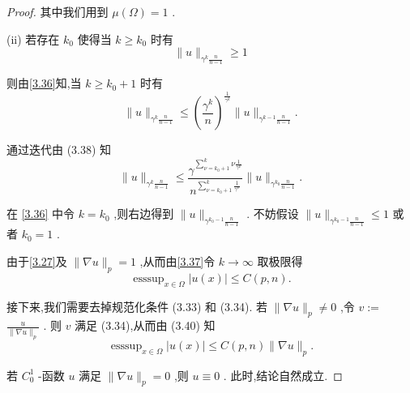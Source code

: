 \documentclass[lang=cn,newtx,10pt,scheme=chinese,thmcnt=chapter]{elegantbook}
\begin{document}
\begin{proof}
其中我们用到 \(\mu \left( \Omega \right)  = 1\) .

(ii) 若存在 \({k}_{0}\) 使得当 \(k \geq  {k}_{0}\) 时有
\begin{equation*}
\parallel u{\parallel }_{{\gamma }^{k}\frac{n}{n - 1}} \geq  1
\end{equation*}

则由\ref{3.36}知,当 \(k \geq  {k}_{0} + 1\) 时有
\begin{equation}
\parallel u{\parallel }_{{\gamma }^{k}\frac{n}{n - 1}} \leqslant  {\left( \frac{{\gamma }^{k}}{n}\right) }^{\frac{1}{{\gamma }^{k}}}\parallel u{\parallel }_{{\gamma }^{k - 1}\frac{n}{n - 1}}. \label{3.38}
\end{equation}

通过迭代由 (3.38) 知
\begin{equation}
\parallel u{\parallel }_{{\gamma }^{k}\frac{n}{n - 1}} \leqslant  \frac{{\gamma }^{\mathop{\sum }\limits_{{\nu  = {k}_{0} + 1}}^{k}\nu \frac{1}{{\gamma }^{\nu }}}}{{n}^{\mathop{\sum }\limits_{{\nu  = {k}_{0} + 1}}^{k}\frac{1}{{\gamma }^{\nu }}}}\parallel u{\parallel }_{{\gamma }^{{k}_{0}}\frac{n}{n - 1}}. \label{3.39}
\end{equation}

在 \ref{3.36} 中令 \(k = {k}_{0}\) ,则右边得到 \(\parallel u{\parallel }_{{\gamma }^{{k}_{0} - 1}\frac{n}{n - 1}}\) . 不妨假设 \(\parallel u{\parallel }_{{\gamma }^{{k}_{0} - 1}\frac{n}{n - 1}} \leqslant  1\) 或者 \({k}_{0} = 1\) .

由于\ref{3.27}及 \(\parallel \nabla u{\parallel }_{p} = 1\) ,从而由\ref{3.37}令 \(k \rightarrow  \infty\) 取极限得
\begin{equation}
{\operatorname{esssup}}_{x \in  \Omega }\left| {u\left( x\right) }\right|  \leqslant  C\left( {p,n}\right) . \label{3.40}
\end{equation}

接下来,我们需要去掉规范化条件 (3.33) 和 (3.34). 若 \(\parallel \nabla u{\parallel }_{p} \neq  0\) ,令 \(v \mathrel{\text{ := }}\)  \(\frac{u}{\parallel \nabla u{\parallel }_{p}}\) . 则 \(v\) 满足 (3.34),从而由 (3.40) 知
\begin{equation}
{\operatorname{esssup}}_{x \in  \Omega }\left| {u\left( x\right) }\right|  \leqslant  C\left( {p,n}\right) \parallel \nabla u{\parallel }_{p}. \label{3.41}
\end{equation}

若 \({C}_{0}^{1}\) -函数 \(u\) 满足 \(\parallel \nabla u{\parallel }_{p} = 0\) ,则 \(u \equiv  0\) . 此时,结论自然成立.


\end{proof}
\end{document}
